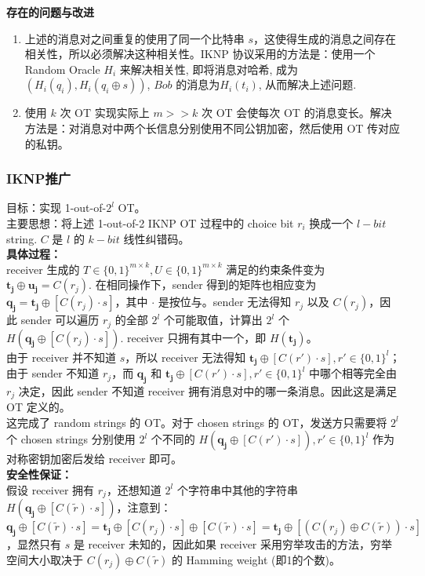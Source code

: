 \textbf{存在的问题与改进}
\begin{enumerate}
  \item  上述的消息对之间重复的使用了同一个比特串 $s$，这使得生成的消息之间存在相关性，所以必须解决这种相关性。IKNP 协议采用的方法是：使用一个 Random Oracle $H_i$ 来解决相关性, 即将消息对哈希, 成为 $(H_i(q_i), H_i(q_i \oplus s))$, $Bob$ 的消息为$H_i(t_i)$, 从而解决上述问题.
  \item  使用 $k$ 次 OT 实现实际上 $m>>k$ 次 OT 会使每次 OT 的消息变长。解决方法是：对消息对中两个长信息分别使用不同公钥加密，然后使用 OT 传对应的私钥。\\
  \end{enumerate}
\subsubsection{IKNP推广\cite{kolesnikov2013improved}}
\noindent 目标：实现 1-out-of-$2^l$ OT。\\
主要思想：将上述 1-out-of-2 IKNP OT 过程中的 choice bit $r_i$ 换成一个 $l-bit$ string. $C$ 是 $l$ 的 $k-bit$ 线性纠错码。\\
\textbf{具体过程：}\\
receiver 生成的 $T\in\{0,1\}^{m\times k}, U\in\{0,1\}^{m\times k}$ 满足的约束条件变为 $\boldsymbol{t_j}\oplus\boldsymbol{u_j}=C(r_j)$. 在相同操作下，sender 得到的矩阵也相应变为 $\boldsymbol{q_ {j}}  =  \boldsymbol{t_ {j}}  \oplus [C(r_ {j})\cdot s ]$，其中 $\cdot$ 是按位与。sender 无法得知 $r_j$ 以及 $C(r_j)$，因此 sender 可以遍历 $r_j$ 的全部 $2^l$ 个可能取值，计算出 $2^l$ 个 $H(\boldsymbol{q_j}\oplus [C(r_j)\cdot s])$. receiver 只拥有其中一个，即 $H(\boldsymbol{t_j})$。\\
  由于 receiver 并不知道 $s$，所以 receiver 无法得知 $\boldsymbol{t_j}\oplus [C(r')\cdot s],r'\in\{0,1\}^l$；由于 sender 不知道 $r_j$，而 $\boldsymbol{q_j}$ 和 $\boldsymbol{t_j}\oplus [C(r')\cdot s],r'\in\{0,1\}^l$ 中哪个相等完全由 $r_j$ 决定，因此 sender 不知道 receiver 拥有消息对中的哪一条消息。因此这是满足 OT 定义的。\\
这完成了 random strings 的 OT。对于 chosen strings 的 OT，发送方只需要将 $2^l$ 个 chosen strings 分别使用 $2^l$ 个不同的 $H(\boldsymbol{q_j}\oplus [C(r')\cdot s]), r'\in\{0,1\}^l$ 作为对称密钥加密后发给 receiver 即可。\\
\textbf{安全性保证：}\\
假设 receiver 拥有 $r_j$，还想知道 $2^l$ 个字符串中其他的字符串 $H(\boldsymbol{q_j}\oplus [C(\tilde{r})\cdot s])$，注意到：\\$\boldsymbol{q_j}\oplus[C(\widetilde{r})\cdot s]=\boldsymbol{t_j}\oplus[C(r_j)\cdot s]\oplus[C(\widetilde{r})\cdot s]=\boldsymbol{t_j}\oplus[(C(r_j)\oplus C(\widetilde{r}))\cdot s]$，显然只有 $s$ 是 receiver 未知的，因此如果 receiver 采用穷举攻击的方法，穷举空间大小取决于 $C(r_j)\oplus C(\widetilde{r})$ 的 Hamming weight (即1的个数)。\\
